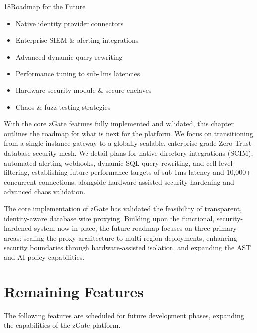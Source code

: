 
\begin{sectionintro}{18}{Roadmap for the Future}{
  \begin{itemize}[leftmargin=1.5em]
    \item Native identity provider connectors
    \item Enterprise SIEM \& alerting integrations
    \item Advanced dynamic query rewriting
    \item Performance tuning to sub-1ms latencies
    \item Hardware security module \& secure enclaves
    \item Chaos \& fuzz testing strategies
  \end{itemize}
}
With the core zGate features fully implemented and validated, this chapter outlines the roadmap for what is next for the platform. We focus on transitioning from a single-instance gateway to a globally scalable, enterprise-grade Zero-Trust database security mesh. We detail plans for native directory integrations (SCIM), automated alerting webhooks, dynamic SQL query rewriting, and cell-level filtering, establishing future performance targets of sub-1ms latency and 10,000+ concurrent connections, alongside hardware-assisted security hardening and advanced chaos validation.
\end{sectionintro}

The core implementation of zGate has validated the feasibility of transparent, identity-aware database wire proxying. Building upon the functional, security-hardened system now in place, the future roadmap focuses on three primary areas: scaling the proxy architecture to multi-region deployments, enhancing security boundaries through hardware-assisted isolation, and expanding the AST and AI policy capabilities.

\section{Remaining Features}

The following features are scheduled for future development phases, expanding the capabilities of the zGate platform.


